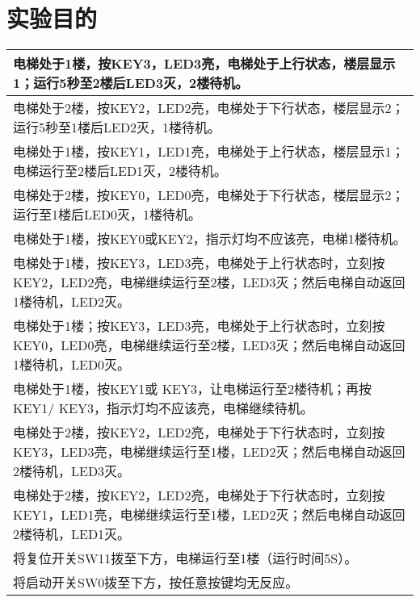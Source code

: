 \section{实验目的}
\begin{table}[!ht]
    \centering
    \begin{tabular}{|l|}
    \hline
        电梯处于1楼，按KEY3，LED3亮，电梯处于上行状态，楼层显示1；运行5秒至2楼后LED3灭，2楼待机。 \\ \hline
        电梯处于2楼，按KEY2，LED2亮，电梯处于下行状态，楼层显示2；运行5秒至1楼后LED2灭，1楼待机。 \\ \hline
        电梯处于1楼，按KEY1，LED1亮，电梯处于上行状态，楼层显示1；电梯运行至2楼后LED1灭，2楼待机。 \\ \hline
        电梯处于2楼，按KEY0，LED0亮，电梯处于下行状态，楼层显示2；运行至1楼后LED0灭，1楼待机。 \\ \hline
        电梯处于1楼，按KEY0或KEY2，指示灯均不应该亮，电梯1楼待机。 \\ \hline
        电梯处于1楼，按KEY3，LED3亮，电梯处于上行状态时，立刻按 KEY2，LED2亮，电梯继续运行至2楼，LED3灭；然后电梯自动返回1楼待机，LED2灭。 \\ \hline
        电梯处于1楼；按KEY3，LED3亮，电梯处于上行状态时，立刻按 KEY0，LED0亮，电梯继续运行至2楼，LED3灭；然后电梯自动返回1楼待机，LED0灭。 \\ \hline
        电梯处于1楼，按KEY1或 KEY3，让电梯运行至2楼待机；再按KEY1/ KEY3，指示灯均不应该亮，电梯继续待机。 \\ \hline
        电梯处于2楼，按KEY2，LED2亮，电梯处于下行状态时，立刻按 KEY3，LED3亮，电梯继续运行至1楼，LED2灭；然后电梯自动返回2楼待机，LED3灭。 \\ \hline
        电梯处于2楼，按KEY2，LED2亮，电梯处于下行状态时，立刻按 KEY1，LED1亮，电梯继续运行至1楼，LED2灭；然后电梯自动返回2楼待机，LED1灭。 \\ \hline
        将复位开关SW11拨至下方，电梯运行至1楼（运行时间5S）。 \\ \hline
        将启动开关SW0拨至下方，按任意按键均无反应。 \\ \hline
    \end{tabular}
\end{table}